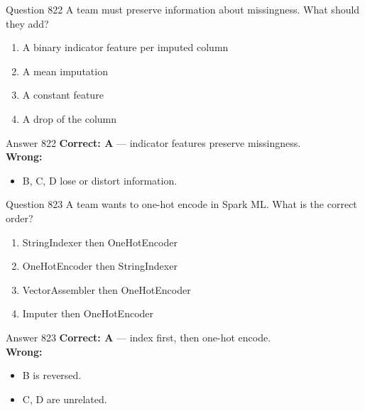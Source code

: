 \documentclass[aspectratio=169,11pt]{beamer}
\begin{document}
	\begin{frame}{Question 822}
		A team must preserve information about missingness. What should they add?
		\begin{enumerate}[label=\Alph*.]
			\item A binary indicator feature per imputed column
			\item A mean imputation
			\item A constant feature
			\item A drop of the column
		\end{enumerate}
	\end{frame}
	\begin{frame}{Answer 822}
		\textbf{Correct: A} --- indicator features preserve missingness.\\
		\vspace{0.5em}
		\textbf{Wrong:}
		\begin{itemize}
			\item B, C, D lose or distort information.
		\end{itemize}
	\end{frame}
	
	\begin{frame}{Question 823}
		A team wants to one-hot encode in Spark ML. What is the correct order?
		\begin{enumerate}[label=\Alph*.]
			\item StringIndexer then OneHotEncoder
			\item OneHotEncoder then StringIndexer
			\item VectorAssembler then OneHotEncoder
			\item Imputer then OneHotEncoder
		\end{enumerate}
	\end{frame}
	\begin{frame}{Answer 823}
		\textbf{Correct: A} --- index first, then one-hot encode.\\
		\vspace{0.5em}
		\textbf{Wrong:}
		\begin{itemize}
			\item B is reversed.
			\item C, D are unrelated.
		\end{itemize}
	\end{frame}
	
\end{document}
